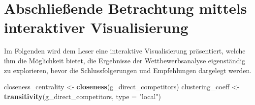 \documentclass[
]{article}
\newenvironment{Shaded}{\begin{snugshade}}{\end{snugshade}}
\newcommand{\AttributeTok}[1]{\textcolor[rgb]{0.13,0.29,0.53}{#1}}
\newcommand{\FunctionTok}[1]{\textcolor[rgb]{0.13,0.29,0.53}{\textbf{#1}}}
\newcommand{\NormalTok}[1]{#1}
\newcommand{\OtherTok}[1]{\textcolor[rgb]{0.56,0.35,0.01}{#1}}
\newcommand{\StringTok}[1]{\textcolor[rgb]{0.31,0.60,0.02}{#1}}
\begin{document}
\section{Abschließende Betrachtung mittels interaktiver
Visualisierung}\label{abschlieuxdfende-betrachtung-mittels-interaktiver-visualisierung}

Im Folgenden wird dem Leser eine interaktive Visualisierung präsentiert,
welche ihm die Möglichkeit bietet, die Ergebnisse der Wettbewerbsanalyse
eigenständig zu explorieren, bevor die Schlussfolgerungen und
Empfehlungen dargelegt werden.

\begin{Shaded}
\begin{Highlighting}[]
\NormalTok{closeness\_centrality }\OtherTok{\textless{}{-}} \FunctionTok{closeness}\NormalTok{(g\_direct\_competitors)}
\NormalTok{clustering\_coeff }\OtherTok{\textless{}{-}} \FunctionTok{transitivity}\NormalTok{(g\_direct\_competitors, }\AttributeTok{type =} \StringTok{"local"}\NormalTok{)}
\end{Highlighting}
\end{Shaded}
\end{document}
